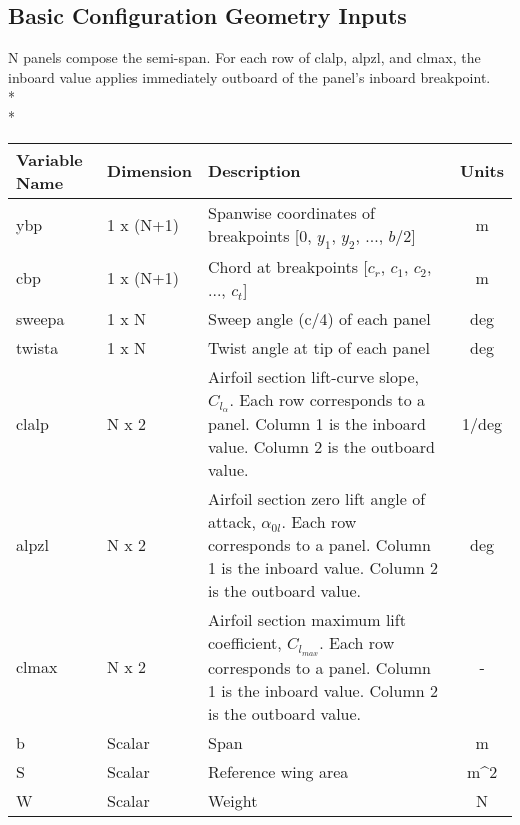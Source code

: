 \documentclass{article}
\begin{document}
\subsection{Basic Configuration Geometry Inputs}
N panels compose the semi-span.  For each row of clalp, alpzl, and
clmax, the inboard value applies immediately outboard of the panel's
inboard breakpoint.\\*\\*
\begin{tabular}{|l|l|p{3.5in}|c|}
  \hline
  \textbf{Variable Name} &
  \textbf{Dimension} &
  \textbf{Description} &
  \textbf{Units}
  \\
  \hline
  ybp & 1 x (N+1) &
  Spanwise coordinates of breakpoints [$0$, $y_1$, $y_2$, ..., $b/2$] &
  m
  \\
  \hline
  cbp & 1 x (N+1) &
  Chord at breakpoints [$c_r$, $c_1$, $c_2$, ..., $c_t$] &
  m
  \\
  \hline
  sweepa & 1 x N &
  Sweep angle (c/4) of each panel &
  deg
  \\
  \hline
  twista & 1 x N &
  Twist angle at tip of each panel &
  deg
  \\
  \hline
  clalp & N x 2 &
  Airfoil section lift-curve slope, $C_{l_\alpha}$.  Each row
  corresponds to a panel.  Column 1 is the inboard value.  Column 2 is
  the outboard value. &
  1/deg
  \\
  \hline
  alpzl & N x 2 &
  Airfoil section zero lift angle of attack, $\alpha_{0l}$.  Each row
  corresponds to a panel.  Column 1 is the inboard value.  Column 2 is
  the outboard value. &
  deg
  \\
  \hline
  clmax & N x 2 &
  Airfoil section maximum lift coefficient, $C_{l_{max}}$.  Each row
  corresponds to a panel.  Column 1 is the inboard value.  Column 2 is
  the outboard value. &
  -
  \\
  \hline
  b & Scalar &
  Span &
  m
  \\
  \hline
  S & Scalar &
  Reference wing area &
  m\^{}2
  \\
  \hline
  W & Scalar &
  Weight &
  N
  \\
  \hline
\end{tabular}
\end{document}
